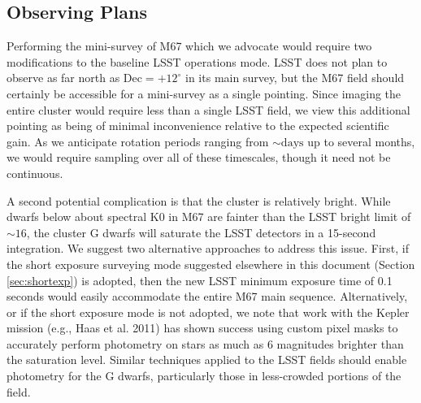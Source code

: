 \subsection{Observing Plans }

Performing the mini-survey of M67 which we advocate would require
two modifications to the baseline LSST operations mode. LSST does
not plan to observe as far north as $\mathrm{Dec}=+12^{\circ}$ in
its main survey, but the M67 field should certainly be accessible
for a mini-survey as a single pointing. Since imaging the entire cluster
would require less than a single LSST field, we view this additional
pointing as being of minimal inconvenience relative to the expected
scientific gain. As we anticipate rotation periods ranging from $\sim\mathrm{days}$
up to several months, we would require sampling over all of these
timescales, though it need not be continuous.

A second potential complication is that the cluster is relatively
bright. While dwarfs below about spectral K0 in M67 are fainter than
the LSST bright limit of $\sim16$, the cluster G dwarfs will saturate
the LSST detectors in a 15-second integration. We suggest two alternative
approaches to address this issue. First, if the short exposure surveying mode
suggested elsewhere in this document (Section \ref{sec:shortexp}) is adopted,
then the new LSST minimum exposure time of 0.1 seconds would easily
accommodate the entire M67 main sequence. Alternatively, or if the
short exposure mode is not adopted, we note that work with the Kepler
mission (e.g., Haas et al. 2011) has shown success using custom pixel
masks to accurately perform photometry on stars as much as 6 magnitudes
brighter than the saturation level. Similar techniques applied to
the LSST fields should enable photometry for the G dwarfs, particularly
those in less-crowded portions of the field.

\navigationbar
